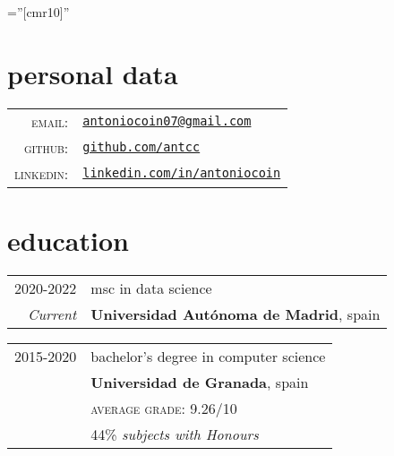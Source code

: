 \documentclass[a4paper,10pt]{article} %
\begin{document}
\pagestyle{empty} %

\font\fb=''[cmr10]'' %


\par{\bigskip\par} %

\section{personal data}

\begin{tabular}{rl}
\textsc{email:} & \href{mailto:antoniocoin07@gmail.com}{\texttt{antoniocoin07@gmail.com}}\\
\textsc{github:} &
\href{https://github.com/antcc}{\texttt{github.com/antcc}}\\
\textsc{linkedin:} &
\href{https://linkedin.com/in/antoniocoin}{\texttt{linkedin.com/in/antoniocoin}}
\end{tabular}


\section{education}

\begin{tabular}{rl}
2020-2022 & msc in data science\\
\footnotesize{\emph{Current}} & \textbf{Universidad Autónoma de Madrid}, spain\\
\end{tabular}

\begin{tabular}{rl}
2015-2020 &  bachelor's degree in computer science\\
& \textbf{Universidad de Granada}, spain\\
&\normalsize \textsc{average grade}: 9.26/10\\
& 44\% \small\emph{subjects with Honours}\\
\end{tabular}
\end{document}

